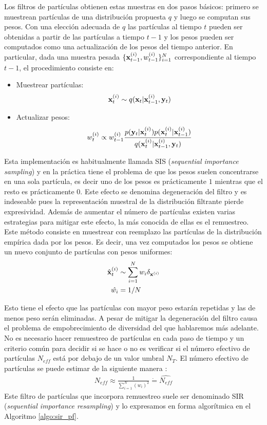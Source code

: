 Los filtros de partículas obtienen estas muestras en dos pasos básicos: primero se muestrean partículas de una distribución propuesta $q$ y luego se computan sus pesos. Con una elección adecuada de $q$ las partículas al tiempo $t$ pueden ser obtenidas a partir de las partículas a tiempo $t-1$ y los pesos pueden ser computados como una actualización de los pesos del tiempo anterior. En particular, dada una muestra pesada $\{\mathbf{x}_{t-1}^{(i)}, w_{t-1}^{(i)}\}_{i=1}^{N}$ correspondiente al tiempo $t-1$, el procedimiento consiste en:
\begin{itemize}
    \item Muestrear partículas:
        \begin{align*}
            \mathbf{x}_{t}^{(i)} \sim q(\mathbf{x}_t | \mathbf{x}_{t-1}^{(i)}, \mathbf{y}_t)
        \end{align*}
    \item Actualizar pesos: 
        \begin{align*}
            w_{t}^{(i)} \propto w_{t-1}^{(i)} \frac{p(\mathbf{y}_t | \mathbf{x}_t^{(i)}) p(\mathbf{x}_t^{(i)} | \mathbf{x}_{t-1}^{(i)})}{q(\mathbf{x}_t^{(i)} | \mathbf{x}_{t-1}^{(i)}, \mathbf{y}_t)}
        \end{align*}
\end{itemize}

Esta implementación es habitualmente llamada SIS (\textit{sequential importance sampling}) y en la práctica tiene el problema de que los pesos suelen concentrarse en una sola partícula, es decir uno de los pesos es prácticamente $1$ mientras que el resto es prácticamente $0$. Este efecto se denomina degeneración del filtro y es indeseable pues la representación muestral de la distribución filtrante pierde expresividad. Además de aumentar el número de partículas existen varias estrategias para mitigar este efecto, la más conocida de ellas es el remuestreo. Este método consiste en muestrear con reemplazo las partículas de la distribución empírica dada por los pesos. Es decir, una vez computados los pesos se obtiene un nuevo conjunto de partículas con pesos uniformes:
\begin{align*}
    \hat{\mathbf{x}}_t^{(i)} &\sim \sum_{i=1}^N w_i \delta_{\mathbf{x}^{(i)}} \\
    \hat{w_i} &= 1 / N
\end{align*}

Esto tiene el efecto que las partículas con mayor peso estarán repetidas y las de menos peso serán eliminadas. A pesar de mitigar la degeneración del filtro causa el problema de empobrecimiento de diversidad del que hablaremos más adelante. No es necesario hacer remuestreo de partículas en cada paso de tiempo y un criterio común para decidir si se hace o no es verificar si el número efectivo de partículas $N_{eff}$ está por debajo de un valor umbral $N_T$. El número efectivo de partículas se puede estimar de la siguiente manera \citep{Liu1998}:
\begin{align*}
    N_{eff} \approx \frac{1}{\sum_{i=1}^N (w_i)^2} \dot{=} \widehat{N_{eff}}
\end{align*}
Este filtro de partículas que incorpora remuestreo suele ser denominado SIR (\textit{sequential importance resampling}) y lo expresamos en forma algorítmica en el Algoritmo \ref{algo:sir_pf}.

